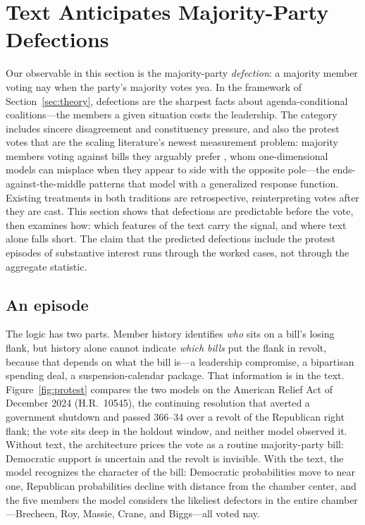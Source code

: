 \documentclass[12pt]{article}
\begin{document}
\section{Text Anticipates Majority-Party Defections}
\label{sec:protest}

Our observable in this section is the majority-party
\emph{defection}: a majority member voting nay when the party's
majority votes yea. In the framework of Section~\ref{sec:theory},
defections are the sharpest facts about agenda-conditional
coalitions---the members a given situation costs the leadership. The
category includes sincere disagreement and constituency pressure, and
also the protest votes that are the scaling literature's newest
measurement problem: majority members voting against bills they
arguably prefer \citep{fowler2026protest}, whom one-dimensional
models can misplace when they appear to side with the opposite
pole---the ends-against-the-middle patterns that
\citet{duckmayr2023ends} model with a generalized response function.
Existing treatments in both traditions are retrospective,
reinterpreting votes after they are cast. This section shows that
defections are predictable before the vote, then examines how: which
features of the text carry the signal, and where text alone falls
short. The claim that the predicted defections include the protest
episodes of substantive interest runs through the worked cases, not
through the aggregate statistic.

\subsection{An episode}

The logic has two parts. Member history identifies \emph{who} sits on
a bill's losing flank, but history alone cannot indicate \emph{which
bills} put the flank in revolt, because that depends on what the bill
is---a leadership compromise, a bipartisan spending deal, a
suspension-calendar package. That information is in the text.
Figure~\ref{fig:protest} compares the two models on the American
Relief Act of December 2024 (H.R.~10545), the continuing resolution
that averted a government shutdown and passed 366--34 over a revolt
of the Republican right flank; the vote sits deep in the holdout
window, and neither model observed it. Without text, the architecture
prices the vote as a routine majority-party bill: Democratic support
is uncertain and the revolt is invisible. With the text, the model
recognizes the character of the bill: Democratic probabilities move
to near one, Republican probabilities decline with distance from the
chamber center, and the five members the model considers the
likeliest defectors in the entire chamber---Brecheen, Roy, Massie,
Crane, and Biggs---all voted nay.
\end{document}
